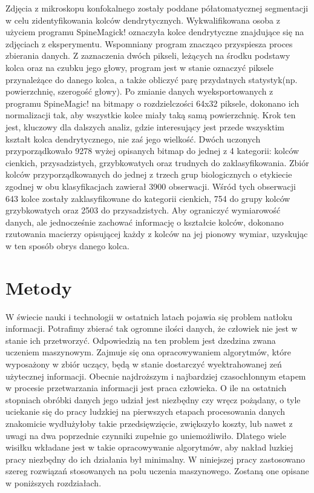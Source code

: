 \documentclass{article}
\begin{document}
Zdjęcia z mikroskopu konfokalnego zostały poddane półatomatycznej segmentacji w celu zidentyfikowania kolców dendrytycznych. 
Wykwalifikowana osoba z użyciem programu SpineMagick! oznaczyła kolce dendrytyczne znajdujące się na zdjęciach z eksperymentu.
Wspomniany program znacząco przyspiesza proces zbierania danych.
Z zaznaczenia dwóch pikseli, leżących na środku podstawy kolca oraz na czubku jego głowy, program jest w stanie oznaczyć piksele przynależące do danego kolca, a także obliczyć parę przydatnych statystyk(np. powierzchnię, szerogość głowy).
Po zmianie danych wyeksportowanych z programu SpineMagic! na bitmapy o rozdzielczości 64x32 piksele, dokonano ich normalizacji tak, aby wszystkie kolce miały taką samą powierzchnię.
Krok ten jest, kluczowy dla dalszych analiz, gdzie interesujący jest przede wszysktim kształt kolca dendrytycznego, nie zaś jego wielkość.
Dwóch uczonych przyporządkowało 9278 wyżej opisanych bitmap do jednej z 4 kategorii: kolców cienkich, przysadzistych, grzybkowatych oraz trudnych do zaklasyfikowania.
Zbiór kolców przyporządkowanych do jednej z trzech grup biologicznych o etykiecie zgodnej w obu klasyfikacjach zawierał 3900 obserwacji.
Wśród tych obserwacji 643 kolce zostały zaklasyfikowane do kategorii cienkich, 754 do grupy kolców grzybkowatych oraz 2503 do przysadzistych.
Aby ograniczyć wymiarowość danych, ale jednocześnie zachować informację o kształcie kolców, dokonano rzutowania macierzy opisującej każdy z kolców na jej pionowy wymiar, uzyskując w ten sposób obrys danego kolca.


\section{Metody}
W świecie nauki i technologii w ostatnich latach pojawia się problem natłoku informacji.
Potrafimy zbierać tak ogromne ilości danych, że człowiek nie jest w stanie ich przetworzyć.
Odpowiedzią na ten problem jest dzedzina zwana uczeniem maszynowym. 
Zajmuje się ona opracowywaniem algorytmów, które wyposażony w zbiór uczący, będą w stanie dostarczyć wyektrahowanej zeń użytecznej informacji.
Obecnie najdroższym i najbardziej czasochłonnym etapem w procesie przetwarzania informacji jest praca człowieka.
O ile na ostatnich stopniach obróbki danych jego udział jest niezbędny czy wręcz pożądany, o tyle uciekanie się do pracy ludzkiej na pierwszych etapach procesowania danych znakomicie wydłużyłoby takie przedsięwzięcie, zwiększyło koszty, lub nawet z uwagi na dwa poprzednie czynniki zupełnie go uniemożliwiło.
Dlatego wiele wisiłku wkładane jest w takie opracowywanie algorytmów, aby nakład luzkiej pracy niezbędny do ich działania był minimalny.
W niniejszej pracy zastosowano szereg rozwiązań stosowanych na polu uczenia maszynowego.
Zostaną one opisane w poniższych rozdziałach.
\end{document}
